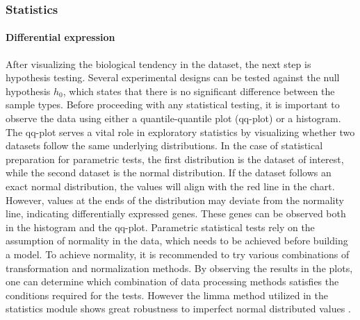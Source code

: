 \documentclass[
  11pt,
]{article}
\begin{document}
\hypertarget{statistics}{%
\subsubsection{Statistics}\label{statistics}}

\hypertarget{differential-expression}{%
\paragraph{Differential expression}\label{differential-expression}}

After visualizing the biological tendency in the dataset, the next step
is hypothesis testing. Several experimental designs can be tested
against the null hypothesis \(h_0\), which states that there is no
significant difference between the sample types. Before proceeding with
any statistical testing, it is important to observe the data using
either a quantile-quantile plot (qq-plot) or a histogram. The qq-plot
serves a vital role in exploratory statistics by visualizing whether two
datasets follow the same underlying distributions. In the case of
statistical preparation for parametric tests, the first distribution is
the dataset of interest, while the second dataset is the normal
distribution. If the dataset follows an exact normal distribution, the
values will align with the red line in the chart. However, values at the
ends of the distribution may deviate from the normality line, indicating
differentially expressed genes. These genes can be observed both in the
histogram and the qq-plot. Parametric statistical tests rely on the
assumption of normality in the data, which needs to be achieved before
building a model. To achieve normality, it is recommended to try various
combinations of transformation and normalization methods. By observing
the results in the plots, one can determine which combination of data
processing methods satisfies the conditions required for the tests.
However the limma method utilized in the statistics module shows great
robustness to imperfect normal distributed values \citep{Ritchie2015}.
\end{document}
